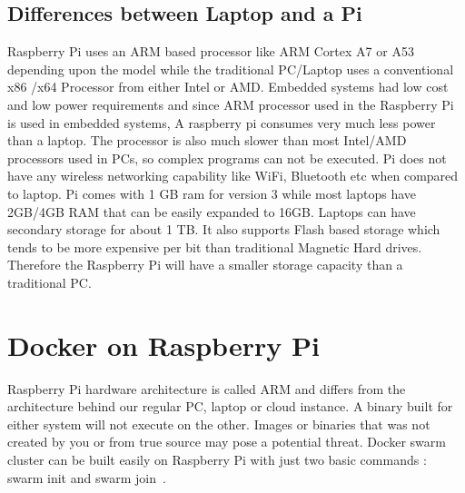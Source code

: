 \subsection{Differences between Laptop and a Pi}
Raspberry Pi uses an ARM based processor like ARM 
Cortex A7 or A53 depending upon the model while the traditional
PC/Laptop uses a conventional x86 /x64 Processor from either
Intel or AMD. Embedded systems had low cost and low power
requirements and since ARM processor used in the Raspberry
Pi is used in embedded systems, A raspberry pi consumes very
much less power than a laptop. The processor is also much slower
than most Intel/AMD processors used in PCs, so complex programs
can not be executed. Pi does not have any wireless networking 
capability like WiFi, Bluetooth etc when compared to laptop. 
Pi comes with 1 GB ram for version 3 while most laptops have
2GB/4GB RAM that can be easily expanded to 16GB. Laptops can
have secondary storage for about 1 TB. It also supports Flash
based storage which tends to be more expensive per bit than 
traditional Magnetic Hard drives. Therefore the Raspberry Pi
will have a smaller storage capacity than a traditional PC. 
    
\section{Docker on Raspberry Pi}
Raspberry Pi hardware architecture is called ARM and differs
from the architecture behind our regular PC, laptop or cloud
instance. A binary built for either system will not execute
on the other. Images or binaries that was not created by 
you or from true source may pose a potential threat. 
Docker swarm cluster can be built easily on Raspberry
Pi with just two basic commands : swarm init and swarm 
join~\cite{dockrpi}.

